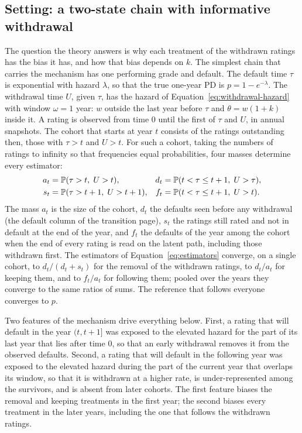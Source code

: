 \subsection{Setting: a two-state chain with informative withdrawal}
\label{sec:theory-setting}

The question the theory answers is why each treatment of the withdrawn ratings has the bias it has, and how that bias depends on $k$. The simplest chain that carries the mechanism has one performing grade and default. The default time $\tau$ is exponential with hazard $\lambda$, so that the true one-year PD is $p=1-e^{-\lambda}$. The withdrawal time $U$, given $\tau$, has the hazard of Equation~\eqref{eq:withdrawal-hazard} with window $\omega=1$ year: $w$ outside the last year before $\tau$ and $\theta=w(1+k)$ inside it. A rating is observed from time $0$ until the first of $\tau$ and $U$, in annual snapshots. The cohort that starts at year $t$ consists of the ratings outstanding then, those with $\tau>t$ and $U>t$. For such a cohort, taking the numbers of ratings to infinity so that frequencies equal probabilities, four masses determine every estimator: %
\begin{align}
a_t&=\mathbb{P}(\tau>t,\;U>t), & d_t&=\mathbb{P}(t<\tau\le t+1,\;U>\tau),\label{eq:masses-a}\\
s_t&=\mathbb{P}(\tau>t+1,\;U>t+1), & f_t&=\mathbb{P}(t<\tau\le t+1,\;U>t).\label{eq:masses-b}
\end{align}
The mass $a_t$ is the size of the cohort, $d_t$ the defaults seen before any withdrawal (the default column of the transition page), $s_t$ the ratings still rated and not in default at the end of the year, and $f_t$ the defaults of the year among the cohort when the end of every rating is read on the latent path, including those withdrawn first. The estimators of Equation~\eqref{eq:estimators} converge, on a single cohort, to $d_t/(d_t+s_t)$ for the removal of the withdrawn ratings, to $d_t/a_t$ for keeping them, and to $f_t/a_t$ for following them; pooled over the years they converge to the same ratios of sums. The reference that follows everyone converges to $p$. %

Two features of the mechanism drive everything below. First, a rating that will default in the year $(t,t+1]$ was exposed to the elevated hazard for the part of its last year that lies after time $0$, so that an early withdrawal removes it from the observed defaults. Second, a rating that will default in the following year was exposed to the elevated hazard during the part of the current year that overlaps its window, so that it is withdrawn at a higher rate, is under-represented among the survivors, and is absent from later cohorts. The first feature biases the removal and keeping treatments in the first year; the second biases every treatment in the later years, including the one that follows the withdrawn ratings. %

